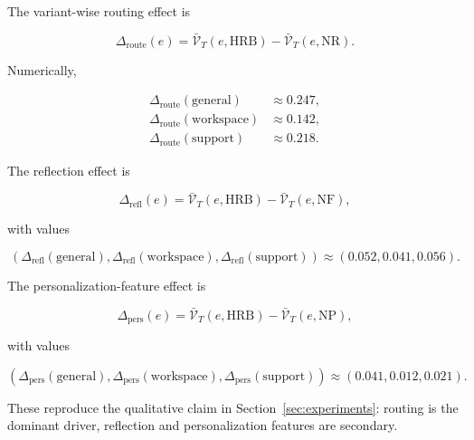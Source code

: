 \documentclass{article} %
\begin{document}
The variant-wise routing effect is

\begin{equation}
\label{eq:app-routing-effect}
\Delta_{\mathrm{route}}(e) = \bar{\mathcal{V}}_T(e,\mathrm{HRB}) - \bar{\mathcal{V}}_T(e,\mathrm{NR}).
\end{equation}

Numerically,

\begin{equation}
\label{eq:app-routing-numbers}
\begin{aligned}
\Delta_{\mathrm{route}}(\mathrm{general}) &\approx 0.247,\\
\Delta_{\mathrm{route}}(\mathrm{workspace}) &\approx 0.142,\\
\Delta_{\mathrm{route}}(\mathrm{support}) &\approx 0.218.
\end{aligned}
\end{equation}

The reflection effect is

\begin{equation}
\label{eq:app-reflection-effect}
\Delta_{\mathrm{refl}}(e) = \bar{\mathcal{V}}_T(e,\mathrm{HRB}) - \bar{\mathcal{V}}_T(e,\mathrm{NF}),
\end{equation}

with values

\begin{equation}
\label{eq:app-reflection-numbers}
(\Delta_{\mathrm{refl}}(\mathrm{general}),\Delta_{\mathrm{refl}}(\mathrm{workspace}),\Delta_{\mathrm{refl}}(\mathrm{support}))
\approx (0.052, 0.041, 0.056).
\end{equation}

The personalization-feature effect is

\begin{equation}
\label{eq:app-pers-effect}
\Delta_{\mathrm{pers}}(e) = \bar{\mathcal{V}}_T(e,\mathrm{HRB}) - \bar{\mathcal{V}}_T(e,\mathrm{NP}),
\end{equation}

with values

\begin{equation}
\label{eq:app-pers-numbers}
(\Delta_{\mathrm{pers}}(\mathrm{general}),\Delta_{\mathrm{pers}}(\mathrm{workspace}),\Delta_{\mathrm{pers}}(\mathrm{support}))
\approx (0.041, 0.012, 0.021).
\end{equation}

These reproduce the qualitative claim in Section~\ref{sec:experiments}: routing is the dominant driver, reflection and personalization features are secondary.
\end{document}
